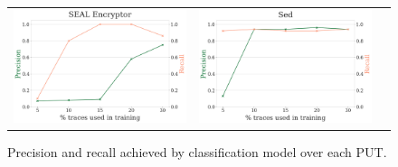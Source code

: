 \begin{figure}[!htbp]
\begin{tabular}{ccc}
        \\ [0.1cm]
		\includegraphics[scale=0.18]{6_1_sealencryptor_prec_rec.png}
		&
		\includegraphics[scale=0.18]{6_24_sed_pr_rec.png}
		\\[0.1cm]
	\end{tabular}  
	\vspace{-10pt}
	\caption{Precision and recall achieved by classification model over each PUT.}
	\vspace{-5pt}
	\label{fig:precision-recall}

\end{figure}

